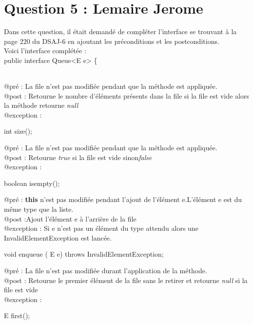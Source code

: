 \section*{Question 5 : Lemaire Jerome}
Dans cette question, il était demandé de compléter l'interface se trouvant à la page 220 du DSAJ-6 en ajoutant les préconditions et les postconditions.\\
Voici l'interface complétée :\\


public interface Queue<E e> \left\{ \\
\\

\begin{size}


@pré : La file n'est pas modifiée pendant que la méthode est appliquée. \\ 
@post : Retourne le nombre d'éléments présents dans la file  si la file est vide alors la méthode retourne \textit{null} \\
 @exception : 

int size\left(\right);\\
\end{size}

\begin{isempty}

@pré : La file n'est pas modifiée pendant que la méthode est appliquée. \\
@post : Retourne \textit{true} si la file est vide sinon\textit{false} \\
 @exception : 

boolean isempty\left(\right);\\
\end{isempty}

\begin{enqueue}

@pré : \textbf{this} n'est pas modifiée pendant l'ajout de l'élément e.L'élément e est du même type que la liste.\\
@post :Ajout l'élément e à l'arrière de la file  \\
@exception : Si e n'est pas un élément du type attendu alors une InvalidElementException est lancée.

void enqueue  \left( E e\right)  throws InvalidElementException;\\
\end{enqueue}

\begin{first}

@pré : La file n'est pas modifiée durant l'application de la méthode. \\
@post : Retourne le premier élément de la file sans le retirer et retourne \textit{null} si la file est vide  \\
 @exception : 

E first\left(\right);\\
\end{first}

